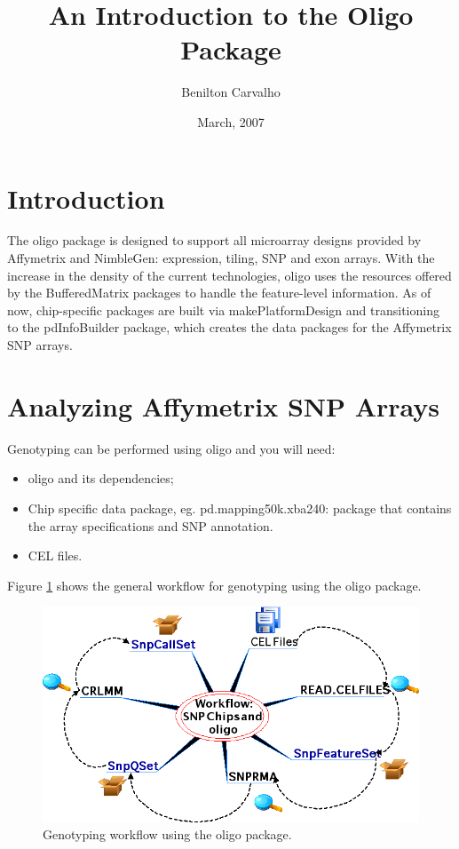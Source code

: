 \documentclass{article}
\newcommand{\Rpackage}[1]{{\textsf{#1}}}
\newcommand{\oligo}{\Rpackage{oligo }}
\begin{document}
\title{An Introduction to the Oligo Package}
\date{March, 2007}
\author{Benilton Carvalho}
\maketitle


\section{Introduction}

The \oligo package is designed to support all microarray designs
provided by Affymetrix and NimbleGen: expression, tiling, SNP and exon
arrays. With the increase in the density of the current technologies,
\oligo uses the resources offered by the \Rpackage{BufferedMatrix}
packages to handle the feature-level information. As of now,
chip-specific packages are built via \Rpackage{makePlatformDesign} and
transitioning to the \Rpackage{pdInfoBuilder} package, which creates
the data packages for the Affymetrix SNP arrays.

\section{Analyzing Affymetrix SNP Arrays}

Genotyping can be performed using \oligo and you will need:

\begin{itemize}
\item \oligo and its dependencies;
\item Chip specific data package, eg. \Rpackage{pd.mapping50k.xba240}:
  package that contains the array specifications and SNP annotation.
\item CEL files.
\end{itemize}

Figure \ref{workflow} shows the general workflow for genotyping using
the \oligo package. 

\begin{figure}[h]
  \centering
  \includegraphics[scale=.5]{workflow.png}
  \caption{Genotyping workflow using the \oligo package.}
  \label{workflow}
\end{figure}
\end{document}
